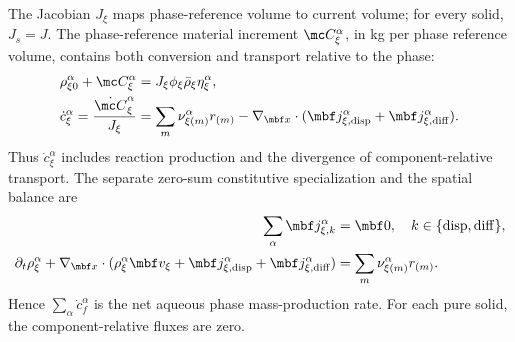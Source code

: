 \documentclass[11pt]{article}
\begin{document}
The Jacobian \(J_\xi\) maps phase-reference volume to current volume; for every solid, \(J_s=J\). The phase-reference material increment \(\mc C_\xi^\alpha\), in kg per phase reference volume, contains both conversion and transport relative to the phase:
\begin{align}
 \rho_{\xi0}^\alpha+\mc C_\xi^\alpha
 &=J_\xi\phi_\xi\bar\rho_\xi\eta_\xi^\alpha,\label{eq:material_measure}\\
 \dot c_\xi^\alpha=\frac{\dot{\mc C}_\xi^\alpha}{J_\xi}
 &=\sum_m\nu_{\xi(m)}^\alpha r_{(m)}
 -\nabla_{\mbf x}\cdot(\mbf j_{\xi,{\rm disp}}^\alpha+\mbf j_{\xi,{\rm diff}}^\alpha).
 \label{eq:material_rate}
\end{align}
Thus \(\dot c_\xi^\alpha\) includes reaction production and the divergence of component-relative transport. The separate zero-sum constitutive specialization and the spatial balance are
\begin{align}
 \sum_\alpha\mbf j_{\xi,k}^\alpha&=\mbf0,
 \quad k\in\{{\rm disp},{\rm diff}\},\label{eq:zero_sum_flux}\\
 \partial_t\rho_\xi^\alpha+\nabla_{\mbf x}\cdot
 (\rho_\xi^\alpha\mbf v_\xi+\mbf j_{\xi,{\rm disp}}^\alpha+\mbf j_{\xi,{\rm diff}}^\alpha)
 &=\sum_m\nu_{\xi(m)}^\alpha r_{(m)}.\label{eq:spatial_component_balance}
\end{align}
Hence \(\sum_\alpha\dot c_f^\alpha\) is the net aqueous phase mass-production rate. For each pure solid, the component-relative fluxes are zero.
\end{document}
